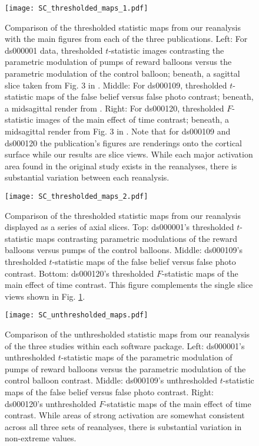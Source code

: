 \begin{figure}[htbp]
\centering
	\texttt{[image: SC\_thresholded\_maps\_1.pdf]}	
\caption{Comparison of the thresholded statistic maps from our reanalysis with the main figures from each of the three publications. Left: For ds000001 data, thresholded $t$-statistic images contrasting the parametric modulation of pumps of reward balloons versus the parametric modulation of the control balloon; beneath, a sagittal slice taken from Fig. 3 in \citet{Schonberg2012-oo}. Middle: For ds000109, thresholded $t$-statistic maps of the false belief versus false photo contrast; beneath, a midsagittal render from \citet{Moran2012-cw}. Right: For ds000120, thresholded $F$-statistic images of the main effect of time contrast; beneath, a midsagittal render from Fig. 3 in \citet{Padmanabhan2011-dc}. Note that for ds000109 and ds000120 the publication's figures are renderings onto the cortical surface while our results are slice views. While each major activation area found in the original study exists in the reanalyses, there is substantial variation between each reanalysis.}
\label{fig:SC_thresholded_maps_1}
\end{figure}

\begin{figure}[htbp]
\centering
	\texttt{[image: SC\_thresholded\_maps\_2.pdf]}	
\caption{Comparison of the thresholded statistic maps from our reanalysis displayed as a series of axial slices. Top: ds000001's thresholded $t$-statistic maps contrasting parametric modulations of the reward balloons versus pumps of the control balloons. Middle: ds000109's thresholded $t$-statistic maps of the false belief versus false photo contrast. Bottom: ds000120's thresholded $F$-statistic maps of the main effect of time contrast. This figure complements the single slice views shown in Fig. \ref{fig:SC_thresholded_maps_1}.}
\label{fig:SC_thresholded_maps_2}
\end{figure}

\begin{figure}[htbp]
\centering
	\texttt{[image: SC\_unthresholded\_maps.pdf]}	
\caption{Comparison of the unthresholded statistic maps from our reanalysis of the three studies within each software package. Left: ds000001's unthresholded $t$-statistic maps of the parametric modulation of pumps of reward balloons versus the parametric modulation of the control balloon contrast. Middle: ds000109's unthresholded $t$-statistic maps of the false belief versus false photo contrast. Right: ds000120's unthresholded $F$-statistic maps of the main effect of time contrast. While areas of strong activation are somewhat consistent across all three sets of reanalyses, there is substantial variation in non-extreme values.}
\label{fig:SC_unthresholded_maps}
\end{figure}

